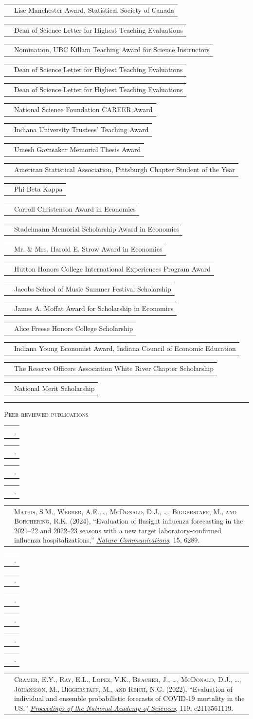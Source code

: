 \documentclass[11pt,letterpaper]{minimal/moderncv}
\makeatletter
\newcommand{\enquote}[1]{{``#1''}}
\newcommand{\cvbibentry}[2]{\cvitem{#2}{\leavevmode\nobreak\bibentry{#1}.\vspace*{6pt}}}
\renewcommand{\section}[1]{  \par\addvspace{15pt}%
  \parbox[t]{\hintscolumnwidth}{\strut\raggedleft\raisebox{4pt}%
  {\rule{\hintscolumnwidth}{2pt}}}%
  \hspace{\separatorcolumnwidth}%
  \textsc{\Large #1}\par\nobreak\addvspace{6pt}%
}
\renewcommand*{\cvitem}[2]{%
  \begin{tabular}{@{}p{\hintscolumnwidth}@{\hspace{\separatorcolumnwidth}}%
    p{\maincolumnwidth}@{}}%
    \raggedleft {#1} &  {#2}%
  \end{tabular}%
}
\makeatother
\begin{document}
\cvitem{2026}{Lise Manchester Award, Statistical Society of Canada}
\cvitem{2024}{Dean of Science Letter for Highest Teaching Evaluations}
\cvitem{2023}{Nomination, UBC Killam Teaching Award for Science Instructors}
\cvitem{}{Dean of Science Letter for Highest Teaching Evaluations}
\cvitem{2022}{Dean of Science Letter for Highest Teaching Evaluations}
\cvitem{2018}{National Science Foundation CAREER Award}   
\cvitem{2017}{Indiana University Trustees' Teaching Award}
\cvitem{2012}{Umesh Gavasakar Memorial Thesis Award}
\cvitem{}{American Statistical Association, Pittsburgh Chapter Student of
  the Year}
\cvitem{2006}{Phi Beta Kappa}
\cvitem{}{Carroll Christenson Award in Economics}
\cvitem{2005}{Stadelmann Memorial Scholarship Award in Economics}
\cvitem{2004}{Mr. \& Mrs. Harold E. Strow Award in Economics}
\cvitem{}{Hutton Honors College International Experiences Program Award}
\cvitem{}{Jacobs School of Music Summer Festival Scholarship}
\cvitem{2003}{James A. Moffat Award for Scholarship in Economics}
\cvitem{2002}{Alice Freese Honors College Scholarship}
\cvitem{}{Indiana Young Economist Award, Indiana Council of Economic
  Education}
\cvitem{}{The Reserve Officers Association White River Chapter Scholarship}
\cvitem{}{National Merit Scholarship}

\section{Peer-reviewed publications}




\cvbibentry{GoldwasserEstimation2026}{2026}
\cvbibentry{LobayWastewater2026}{}
\cvbibentry{lobay2025latent}{2025}
\cvbibentry{rtestim}{2024}
\cvitem{}{{\scshape Mathis, S.M., Webber, A.E.,\ldots, McDonald, D.J., \ldots,
Biggerstaff, M., and Borchering, R.K.} (2024), \enquote{Evaluation of flusight
influenza forecasting in the 2021--22 and 2022--23 seasons with a new target
laboratory-confirmed influenza hospitalizations,}
\href{https://doi.org/10.1038/s41467-024-50601-9}{\em Nature
Communications}, 15, 6289.\vspace*{6pt}}
\cvbibentry{whitematter}{}
\cvbibentry{McDonaldSharpnack2019}{}
\cvbibentry{sparsegl}{}
\cvbibentry{TuzhlinaHastie2023}{}

\cvbibentry{PhamDing2020}{2023}

\cvbibentry{DingMcDonald2019}{2022}
\cvitem{}{{\scshape Cramer, E.Y., Ray, E.L., Lopez, V.K., Bracher, J., \ldots,
    McDonald, D.J., \ldots,  Johansson, M., Biggerstaff, M., and Reich, N.G.}
    (2022), ``Evaluation of individual and ensemble probabilistic forecasts of
    {COVID-19} mortality in the US,''
    \href{https://doi.org/10.1073/pnas.211356111}{\em Proceedings of the
    National Academy of Sciences},  119, e2113561119.\vspace*{6pt}}
\end{document}
